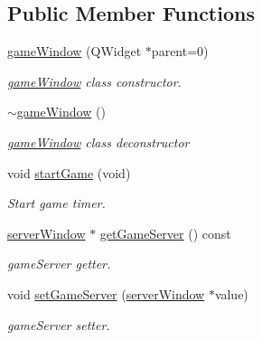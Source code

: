 \subsection*{Public Member Functions}
\begin{DoxyCompactItemize}
\item 
\mbox{\hyperlink{classgame_window_af31e4cb1c92ed36e03ef264c8d4efa51}{game\+Window}} (Q\+Widget $\ast$parent=0)
\begin{DoxyCompactList}\small\item\em \mbox{\hyperlink{classgame_window}{game\+Window}} class constructor. \end{DoxyCompactList}\item 
\mbox{\hyperlink{classgame_window_a13773b6a92bc1d9a7e0067ed99fa4e20}{$\sim$game\+Window}} ()
\begin{DoxyCompactList}\small\item\em \mbox{\hyperlink{classgame_window}{game\+Window}} class deconstructor \end{DoxyCompactList}\item 
void \mbox{\hyperlink{classgame_window_a790233fd0316f05a1fd35738d383349b}{start\+Game}} (void)
\begin{DoxyCompactList}\small\item\em Start game timer. \end{DoxyCompactList}\item 
\mbox{\label{classgame_window_a53a82990ddc2c819e3570ad52b340a90}} 
\mbox{\hyperlink{classserver_window}{server\+Window}} $\ast$ \mbox{\hyperlink{classgame_window_a53a82990ddc2c819e3570ad52b340a90}{get\+Game\+Server}} () const
\begin{DoxyCompactList}\small\item\em game\+Server getter. \end{DoxyCompactList}\item 
\mbox{\label{classgame_window_a488fb57d2d073817325f8128dee0f85d}} 
void \mbox{\hyperlink{classgame_window_a488fb57d2d073817325f8128dee0f85d}{set\+Game\+Server}} (\mbox{\hyperlink{classserver_window}{server\+Window}} $\ast$value)
\begin{DoxyCompactList}\small\item\em game\+Server setter. \end{DoxyCompactList}\item 
\mbox{\label{classgame_window_a69e38c52ddea9d76beea2b7ad38b399e}} 

\end{DoxyCompactItemize}
